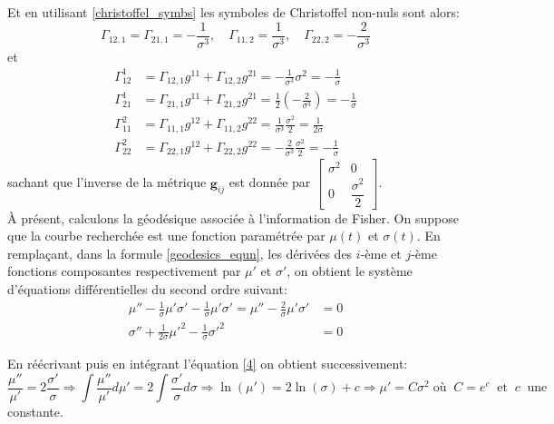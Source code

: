 \documentclass[11pt, letterpaper]{article}
\begin{document}
	Et en utilisant \eqref{christoffel_symbs} les symboles de Christoffel non-nuls sont alors:
	\begin{equation*}
	    \Gamma_{12,1}=\Gamma_{21,1}=-\frac{1}{\sigma^3},\quad \Gamma_{11,2}=\frac{1}{\sigma^3}, \quad \Gamma_{22,2}=-\frac{2}{\sigma^3}
	\end{equation*}
	et 
	\begin{align*}
	    \Gamma_{12}^1&=\Gamma_{12,1}g^{11}+\Gamma_{12,2}g^{21}=-\frac{1}{\sigma^3}\sigma^2=-\frac{1}{\sigma}\\
	    \Gamma_{21}^1&=\Gamma_{21,1}g^{11}+\Gamma_{21,2}g^{21}=\frac{1}{2}\left(-\frac{2}{\sigma^3}\right)=-\frac{1}{\sigma}\\
	    \Gamma_{11}^2&=\Gamma_{11,1}g^{12}+\Gamma_{11,2}g^{22}=\frac{1}{\sigma^3}\frac{\sigma^2}{2}=\frac{1}{2\sigma}\\
	    \Gamma_{22}^2&=\Gamma_{22,1}g^{12}+\Gamma_{22,2}g^{22}=-\frac{2}{\sigma^3}\frac{\sigma^2}{2}=-\frac{1}{\sigma}
	\end{align*}
	sachant que l'inverse de la métrique $\mathbf{g}_{ij}$ est donnée par $\begin{bmatrix}
	    \sigma^2 & 0
	    \\[5pt]
	    0 & \dfrac{\sigma^2}{2}
	    \end{bmatrix}$.\\
	    
	À présent, calculons la géodésique associée à l'information de Fisher. On suppose que la courbe recherchée est une fonction paramétrée par $\mu(t)$ et $\sigma(t)$. En remplaçant, dans la formule \eqref{geodesics_equn}, les dérivées des $i$-ème et $j$-ème fonctions composantes respectivement par $\mu'$ et $\sigma'$, on obtient le système d'équations différentielles du second ordre suivant:
	\begin{align}
	    \mu''-\frac{1}{\sigma}\mu'\sigma'-\frac{1}{\sigma}\mu'\sigma'=\mu''-\frac{2}{\sigma}\mu'\sigma'&=0\label{4}\\
	    \sigma''+\frac{1}{2\sigma}\mu'^2-\frac{1}{\sigma}\sigma'^2&=0\label{5}
	\end{align}
	
	En réécrivant puis en intégrant l'équation \eqref{4} on obtient successivement:
	\begin{equation*}
	    \frac{\mu''}{\mu'}=2\frac{\sigma'}{\sigma}\Longrightarrow\int\frac{\mu''}{\mu'}d\mu'=2\int\frac{\sigma'}{\sigma}d\sigma\Longrightarrow\ln(\mu')=2\ln(\sigma)+c\Longrightarrow\mu'=C\sigma^2\;\text{où}\;\; C=e^c\;\;\text{et}\;\;c\;\;\text{une}  
	\end{equation*}
	constante.
	
\end{document}
